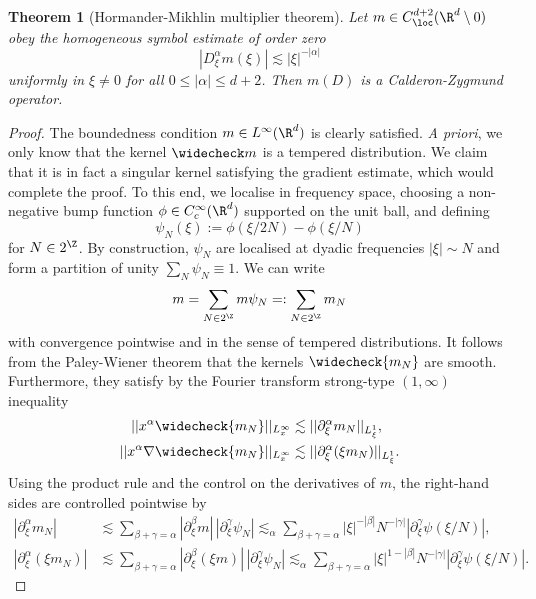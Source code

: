 \documentclass[reqno]{amsart}
\newtheorem{theorem}{Theorem}
\theoremstyle{definition}
\theoremstyle{remark}
\begin{document}
\begin{theorem}[Hormander-Mikhlin multiplier theorem]
	Let $m \in C^{d + 2}_{\loc} (\R^d \setminus 0)$ obey the homogeneous symbol estimate of order zero
		\[ |D^\alpha_\xi m(\xi)| \lesssim |\xi|^{-|\alpha|} \]
	uniformly in $\xi \neq 0$ for all $0 \leq |\alpha| \leq d + 2$. Then $m(D)$ is a Calderon-Zygmund operator. 	
\end{theorem}
\begin{proof}
	The boundedness condition $m \in L^\infty (\R^d)$ is clearly satisfied. \textit{A priori}, we only know that the kernel $\widecheck m$ is a tempered distribution. We claim that it is in fact a singular kernel satisfying the gradient estimate, which would complete the proof. To this end, we localise in frequency space, choosing a non-negative bump function $\phi \in C^\infty_c (\R^d)$ supported on the unit ball, and defining
		\[ \psi_N (\xi) := \phi(\xi/2N) - \phi(\xi/N) \] 
	for $N \in 2^\Z$. By construction, $\psi_N$ are localised at dyadic frequencies $|\xi| \sim N$ and form a partition of unity $\sum_N \psi_N \equiv 1$. We can write
		\[ m = \sum_{N \in 2^\Z} m \psi_N =: \sum_{N \in 2^\Z} m_N  \]
	with convergence pointwise and in the sense of tempered distributions. It follows from the Paley-Wiener theorem that the kernels $\widecheck{m_N}$ are smooth. Furthermore, they satisfy by the Fourier transform strong-type $(1, \infty)$ inequality
		\begin{align*}
			||x^\alpha \widecheck{m_N} ||_{L^\infty_x} 
			 	&\lesssim ||\partial^\alpha_\xi  m_N||_{L^1_\xi} ,\\
			 ||x^\alpha \nabla \widecheck{m_N} ||_{L^\infty_x} 
			 	&\lesssim ||\partial^\alpha_\xi (\xi m_N)||_{L^1_\xi} .
		\end{align*} 
	Using the product rule and the control on the derivatives of $m$, the right-hand sides are controlled pointwise by 
		\begin{align*}
			\left|\partial^\alpha_\xi m_N\right| 
				&\lesssim \sum_{\beta + \gamma = \alpha} | \partial^{\beta}_\xi  m| \, |\partial^\gamma_\xi \psi_N| \lesssim_\alpha \sum_{\beta + \gamma = \alpha} |\xi|^{- |\beta|} N^{-|\gamma|} |\partial_\xi^\gamma \psi (\xi/N)|, \\
			\left|\partial^\alpha_\xi (\xi m_N)\right| 
				&\lesssim \sum_{\beta + \gamma = \alpha} | \partial^{\beta}_\xi (\xi m)| \, |\partial^\gamma_\xi \psi_N| \lesssim_\alpha \sum_{\beta + \gamma = \alpha} |\xi|^{1 - |\beta|} N^{-|\gamma|} |\partial_\xi^\gamma \psi (\xi/N)|.   
		\end{align*}	

\end{proof}
\end{document}

